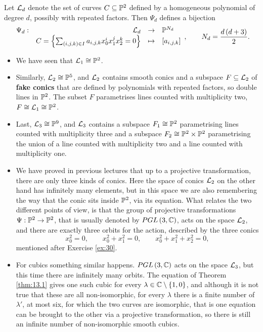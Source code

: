 \begin{definition}
Let $ \LL_d $ denote the set of curves $ C \subseteq \P^2 $ defined by a homogeneous polynomial of degree $ d $, possibly with repeated factors. Then $ \Psi_d $ defines a bijection
$$ \function[\Psi_d]{\LL_d}{\P^{N_d}}{C = \cb{\sum_{\rb{i, j, k} \in I} a_{i, j, k}x_0^ix_1^jx_2^k = 0}}{\sb{a_{i, j, k}}}, \qquad N_d = \dfrac{d\rb{d + 3}}{2}. $$
\end{definition}

\begin{example}
\hfill
\begin{itemize}
\item We have seen that $ \LL_1 \cong \P^2 $.
\item Similarly, $ \LL_2 \cong \P^5 $, and $ \LL_2 $ contains smooth conics and a subspace $ F \subseteq \LL_2 $ of \textbf{fake conics} that are defined by polynomials with repeated factors, so double lines in $ \P^2 $. The subset $ F $ parametrises lines counted with multiplicity two, $ F \cong \LL_1 \cong \P^2 $.
\item Last, $ \LL_3 \cong \P^9 $, and $ \LL_3 $ contains a subspace $ F_1 \cong \P^2 $ parametrising lines counted with multiplicity three and a subspace $ F_2 \cong \P^2 \times \P^2 $ parametrising the union of a line counted with multiplicity two and a line counted with multiplicity one.
\end{itemize}
\end{example}

\begin{remark}
\hfill
\begin{itemize}
\item We have proved in previous lectures that up to a projective transformation, there are only three kinds of conics. Here the space of conics $ \LL_2 $ on the other hand has infinitely many elements, but in this space we are also remembering the way that the conic sits inside $ \P^2 $, via its equation. What relates the two different points of view, is that the group of projective transformations $ \Psi : \P^2 \to \P^2 $, that is usually denoted by $ PGL\rb{3, \C} $, acts on the space $ \LL_2 $, and there are exactly three orbits for the action, described by the three conics
$$ x_0^2 = 0, \qquad x_0^2 + x_1^2 = 0, \qquad x_0^2 + x_1^2 + x_2^2 = 0, $$
mentioned after Exercise \ref{ex:30}.
\item For cubics something similar happens. $ PGL\rb{3, \C} $ acts on the space $ \LL_3 $, but this time there are infinitely many orbits. The equation of Theorem \ref{thm:13.1} gives one such cubic for every $ \lambda \in \C \setminus \cb{1, 0} $, and although it is not true that these are all non-isomorphic, for every $ \lambda $ there is a finite number of $ \lambda' $, at most six, for which the two curves are isomorphic, that is one equation can be brought to the other via a projective transformation, so there is still an infinite number of non-isomorphic smooth cubics.
\end{itemize}
\end{remark}

